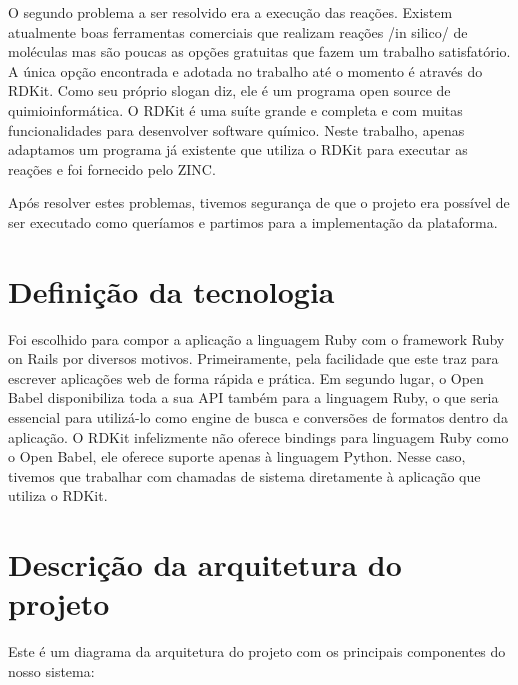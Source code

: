 \documentclass{abnt}
\begin{document}
O segundo problema a ser resolvido era a execução das reações. Existem atualmente boas ferramentas comerciais que realizam reações /in silico/ de moléculas mas são poucas as opções gratuitas que fazem um trabalho satisfatório. A única opção encontrada e adotada no trabalho até o momento é através do RDKit. Como seu próprio slogan diz, ele é um programa open source de quimioinformática. O RDKit é uma suíte grande e completa e com muitas funcionalidades para desenvolver software químico. Neste trabalho, apenas adaptamos um programa já existente que utiliza o RDKit para executar as reações e foi fornecido pelo ZINC.

Após resolver estes problemas, tivemos segurança de que o projeto era possível de ser executado como queríamos e partimos para a implementação da plataforma.

\section{Definição da tecnologia}

Foi escolhido para compor a aplicação a linguagem Ruby com o framework Ruby on Rails por diversos motivos. Primeiramente, pela facilidade que este traz para escrever aplicações web de forma rápida e prática. Em segundo lugar, o Open Babel disponibiliza toda a sua API também para a linguagem Ruby, o que seria essencial para utilizá-lo como engine de busca e conversões de formatos dentro da aplicação. O RDKit infelizmente não oferece bindings para linguagem Ruby como o Open Babel, ele oferece suporte apenas à linguagem Python. Nesse caso, tivemos que trabalhar com chamadas de sistema diretamente à aplicação que utiliza o RDKit.

\section{Descrição da arquitetura do projeto}

Este é um diagrama da arquitetura do projeto com os principais componentes do nosso sistema:


\end{document}
